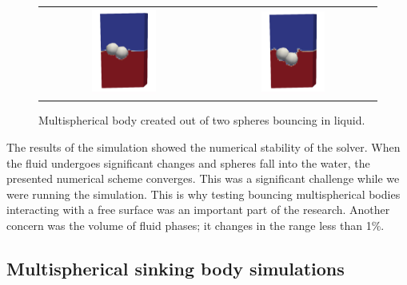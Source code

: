 \begin{figure}[!ht]
  \centering
  \begin{tabular}{cc}
    \includegraphics[width=0.4\textwidth]{Images/chap3/2_sph_2.jpg} & \includegraphics[width=0.4\textwidth]{Images/chap3/2_sph_1.jpg} 
  \end{tabular}
  \caption{Multispherical body created out of two spheres bouncing in liquid.}
  \label{fig:two-phase exp}
\end{figure}

The results of the simulation showed the numerical stability of the solver. When the fluid undergoes significant changes and spheres fall into the water, the presented numerical scheme converges. This was a significant challenge while we were running the simulation. This is why testing bouncing multispherical bodies interacting with a free surface was an important part of the research. Another concern was the volume of fluid phases; it changes in the range less than 1\%.

\subsection{Multispherical sinking body simulations}

